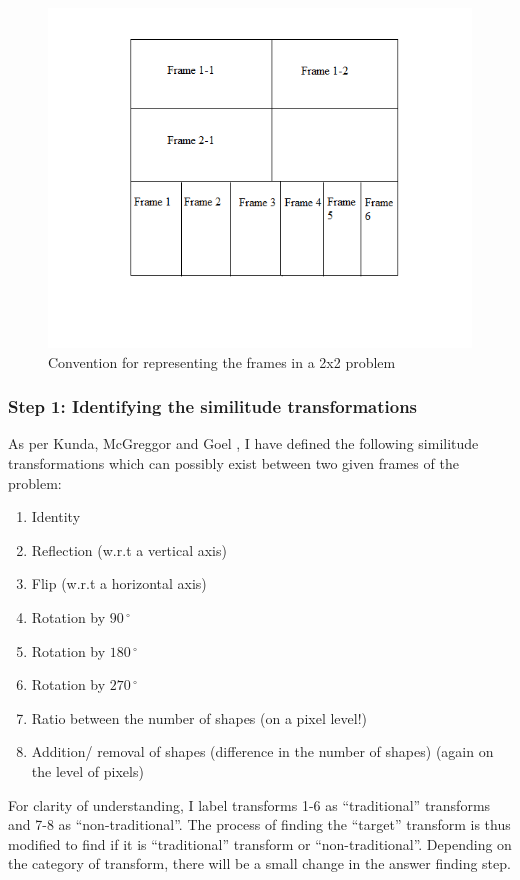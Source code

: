 \documentclass[10pt, letter]{article}
\begin{document}
\begin{figure}[h!]
  \centering
    \includegraphics[scale = 0.5]{Images/Fig4}
    \caption{Convention for representing the frames in a 2x2 problem}
  \label{fig4}
\end{figure}

\subsubsection*{Step 1: Identifying the similitude transformations}
As per Kunda, McGreggor and Goel \cite{paper}, I have defined the following similitude transformations which can possibly exist between two given frames of the problem:
\begin{enumerate}
\item Identity
\item Reflection (w.r.t a vertical axis)
\item Flip (w.r.t a horizontal axis)
\item Rotation by $90\,^{\circ}$
\item Rotation by $180\,^{\circ}$
\item Rotation by $270\,^{\circ}$
\item Ratio between the number of shapes (on a pixel level!)
\item Addition/ removal of shapes (difference in the number of shapes) (again on the level of pixels)
\end{enumerate}

For clarity of understanding, I label transforms 1-6 as ``traditional'' transforms and 7-8 as ``non-traditional''. The process of finding the ``target'' transform is thus modified to find if it is ``traditional'' transform or ``non-traditional''. Depending on the category of transform, there will be a small change in the answer finding step.
\end{document}
